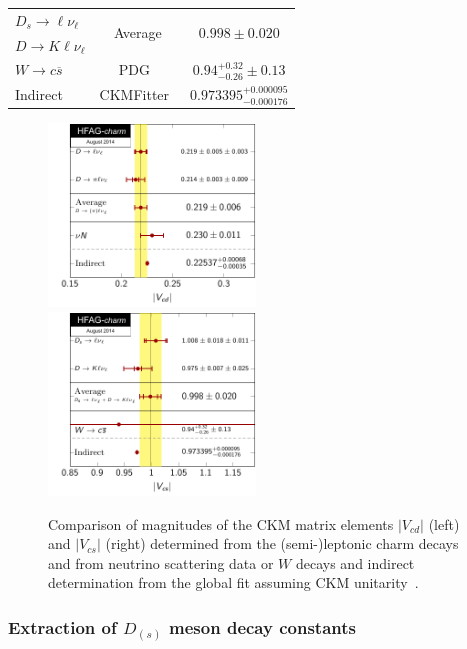\begin{table}[htb]
\begin{center}
\begin{tabular}{lcc}
\midrule
\rowcolor{Gray} $D_s\to\ell\nu_{\ell}$ 	& \multirow{2}{*}{Average}	& \multirow{2}{*}{$0.998\pm0.020$}\\
\rowcolor{Gray} $D\to K\ell\nu_{\ell}$ & \multirow{-2}{*}{Average}	& \multirow{-2}{*}{$0.998\pm0.020$}\\
\midrule
$W\to c\overline{s}$	& PDG~\cite{PDG_2012}	& $0.94^{+0.32}_{-0.26}\pm0.13$\\
Indirect		& CKMFitter~\cite{CKMFitter}		& $0.973395^{+0.000095}_{-0.000176}$\\
\bottomrule
\end{tabular}
\end{center}
\end{table}

\begin{figure}[hbt!]
\centering
\includegraphics[width=0.49\textwidth]{figures/charm/Vcd.pdf}~
\includegraphics[width=0.49\textwidth]{figures/charm/Vcs.pdf}
\caption{
Comparison of magnitudes of the CKM matrix elements $|V_{cd}|$ (left) and $|V_{cs}|$ (right) determined from the (semi-)leptonic charm decays and from neutrino scattering data
or $W$ decays and indirect determination from the global fit assuming CKM unitarity~\cite{CKMFitter}.
\label{fig:VcdVcsComparions}
}
\end{figure}

\subsubsection{Extraction of $D_{(s)}$ meson decay constants}


